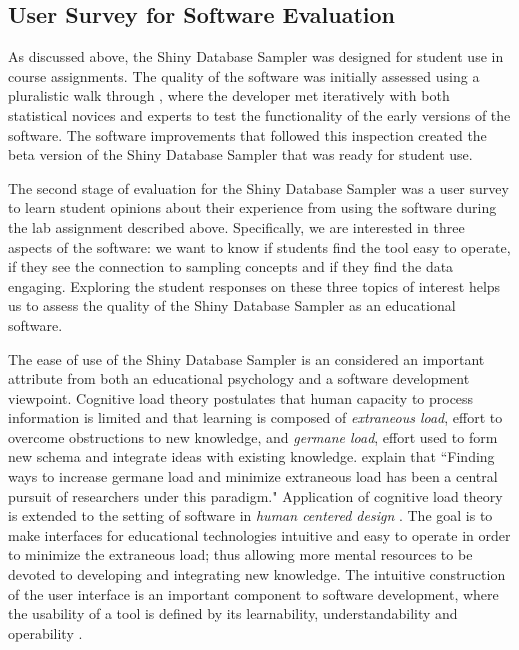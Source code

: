 \documentclass[11pt]{isuthesis}\usepackage[]{graphicx}\usepackage[]{color}
\begin{document}
\subsection{User Survey for Software Evaluation}

As discussed above, the Shiny Database Sampler was designed for student use in course assignments. The quality of the software was initially assessed using a pluralistic walk through \citep{nielsen1994}, where the developer met iteratively with both statistical novices and experts to test the functionality of the early versions of the software. The software improvements that followed this inspection created the beta version of the Shiny Database Sampler that was ready for student use.

The second stage of evaluation for the Shiny Database Sampler was a user survey to learn student opinions about their experience from using the software during the lab assignment described above. Specifically, we are interested in three aspects of the software: we want to know if students find the tool easy to operate, if they see the connection to sampling concepts and if they find the data engaging. Exploring the student responses on these three topics of interest helps us to assess the quality of the Shiny Database Sampler as an educational software.

The ease of use of the Shiny Database Sampler is an considered an important attribute from both an educational psychology and a software development viewpoint. Cognitive load theory postulates that human capacity to process information is limited and that learning is composed of \textit{extraneous load}, effort to overcome obstructions to new knowledge, and \textit{germane load}, effort used to form new schema and integrate ideas with existing knowledge. \citet{muller2008} explain that ``Finding ways to increase germane load and minimize extraneous load has been a central pursuit of researchers under this paradigm." Application of cognitive load theory is extended to the setting of software in \textit{human centered design} \citep{oviatt2006}. The goal is to make interfaces for educational technologies intuitive and easy to operate in order to minimize the extraneous load; thus allowing more mental resources to be devoted to developing and integrating new knowledge. The intuitive construction of the user interface is an important component to software development, where the usability of a tool is defined by its learnability, understandability and operability \citep{manuel2002quality}.
\end{document}
